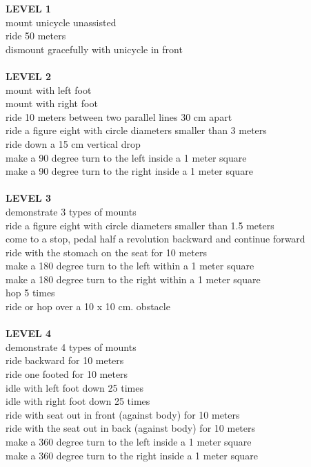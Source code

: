 \textbf{LEVEL 1}\\
mount unicycle unassisted\\
ride 50 meters\\
dismount gracefully with unicycle in front\\\\
\textbf{LEVEL 2}\\
mount with left foot\\
mount with right foot\\
ride 10 meters between two parallel lines 30 cm apart\\
ride a figure eight with circle diameters smaller than 3 meters\\
ride down a 15 cm vertical drop\\
make a 90 degree turn to the left inside a 1 meter square\\
make a 90 degree turn to the right inside a 1 meter square\\\\
\textbf{LEVEL 3}\\
demonstrate 3 types of mounts\\
ride a figure eight with circle diameters smaller than 1.5 meters\\
come to a stop, pedal half a revolution backward and continue forward\\
ride with the stomach on the seat for 10 meters\\
make a 180 degree turn to the left within a 1 meter square\\
make a 180 degree turn to the right within a 1 meter square\\
hop 5 times\\
ride or hop over a 10 x 10 cm. obstacle\\\\
\textbf{LEVEL 4}\\
demonstrate 4 types of mounts\\
ride backward for 10 meters\\
ride one footed for 10 meters\\
idle with left foot down 25 times\\
idle with right foot down 25 times\\
ride with seat out in front (against body) for 10 meters\\
ride with the seat out in back (against body) for 10 meters\\
make a 360 degree turn to the left inside a 1 meter square\\
make a 360 degree turn to the right inside a 1 meter square\\\\
